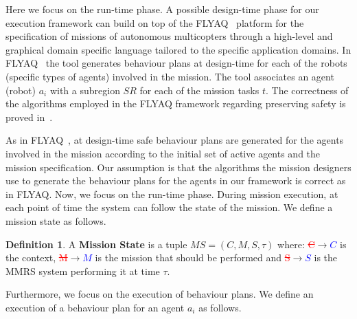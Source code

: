 \documentclass[journal]{IEEEtran}
\theoremstyle{definition}
\newtheorem{definition}{Definition}
\newcommand{\ra}{$\rightarrow$}
\newcommand{\chg}[2]{\textcolor{red}{\sout{#1}}{\ra}\textcolor{blue}{\uline{#2}}} %
\begin{document}
Here we focus on the run-time phase.  
A possible design-time phase for our execution framework can build on top of
the FLYAQ~\cite{bozhinoski2015flyaq, di2013engineering} platform for the specification of missions of autonomous multicopters through a high-level and graphical domain specific language tailored to the specific application
domains. In FLYAQ~\cite{bozhinoski2015flyaq, di2013engineering} the tool generates behaviour plans at design-time for each of the robots (specific types of agents) involved in the mission. The tool associates an agent (robot) $a_i$ with a subregion $SR$ for each of the mission tasks $t$. The correctness of the algorithms employed in the FLYAQ framework regarding preserving safety is proved in~\cite{ruscio2016automatic}.


As in FLYAQ~\cite{bozhinoski2015flyaq, di2013engineering}, at design-time safe behaviour plans are generated for the agents involved in the mission  according to the initial set of active agents and the mission specification. 
Our assumption is that the algorithms the mission designers use to generate the behaviour plans for the agents in our framework is correct as in FLYAQ. 
Now, we focus on the run-time phase.
During mission execution, at each point of time the system can follow the state of the mission. We define a mission state as follows.

\begin{definition}
A \textbf{Mission State} is a tuple $MS = ( C, M, S, \tau  )$ where: \chg{C}{$C$} is the context, \chg{M}{$M$} is the mission that should be performed and \chg{S}{$S$} is the MMRS system performing it at time $\tau$.
\end{definition}

Furthermore, we focus on the execution of behaviour plans.
We define an execution of a behaviour plan for an agent $a_i$ as follows.
\end{document}
